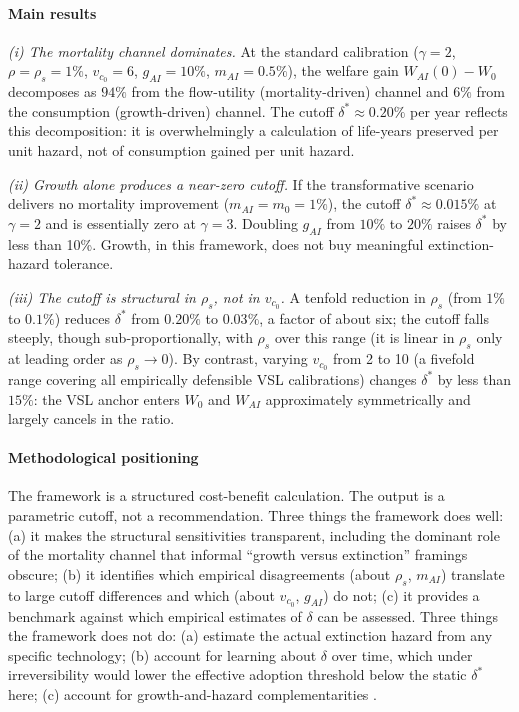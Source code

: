 \documentclass{_latex/house}
\begin{document}
\paragraph{Main results}

\emph{(i) The mortality channel dominates.} At the standard calibration ($\gamma = 2$, $\rho = \rho_s = 1\%$, $v_{c_0} = 6$, $g_{AI} = 10\%$, $m_{AI} = 0.5\%$), the welfare gain $W_{AI}(0) - W_0$ decomposes as $94\%$ from the flow-utility (mortality-driven) channel and $6\%$ from the consumption (growth-driven) channel. The cutoff $\delta^* \approx 0.20\%$ per year reflects this decomposition: it is overwhelmingly a calculation of life-years preserved per unit hazard, not of consumption gained per unit hazard.

\emph{(ii) Growth alone produces a near-zero cutoff.} If the transformative scenario delivers no mortality improvement ($m_{AI} = m_0 = 1\%$), the cutoff $\delta^* \approx 0.015\%$ at $\gamma = 2$ and is essentially zero at $\gamma = 3$. Doubling $g_{AI}$ from $10\%$ to $20\%$ raises $\delta^*$ by less than 10\%. Growth, in this framework, does not buy meaningful extinction-hazard tolerance.

\emph{(iii) The cutoff is structural in $\rho_s$, not in $v_{c_0}$.} A tenfold reduction in $\rho_s$ (from $1\%$ to $0.1\%$) reduces $\delta^*$ from $0.20\%$ to $0.03\%$, a factor of about six; the cutoff falls steeply, though sub-proportionally, with $\rho_s$ over this range (it is linear in $\rho_s$ only at leading order as $\rho_s\to0$). By contrast, varying $v_{c_0}$ from 2 to 10 (a fivefold range covering all empirically defensible VSL calibrations) changes $\delta^*$ by less than $15\%$: the VSL anchor enters $W_0$ and $W_{AI}$ approximately symmetrically and largely cancels in the ratio.

\paragraph{Methodological positioning} The framework is a structured cost-benefit calculation. The output is a parametric cutoff, not a recommendation. Three things the framework does well: (a) it makes the structural sensitivities transparent, including the dominant role of the mortality channel that informal ``growth versus extinction'' framings obscure; (b) it identifies which empirical disagreements (about $\rho_s$, $m_{AI}$) translate to large cutoff differences and which (about $v_{c_0}$, $g_{AI}$) do not; (c) it provides a benchmark against which empirical estimates of $\delta$ can be assessed. Three things the framework does not do: (a) estimate the actual extinction hazard from any specific technology; (b) account for learning about $\delta$ over time, which under irreversibility would lower the effective adoption threshold below the static $\delta^*$ here; (c) account for growth-and-hazard complementarities \citep{jones2024aidilemma}.
\end{document}

